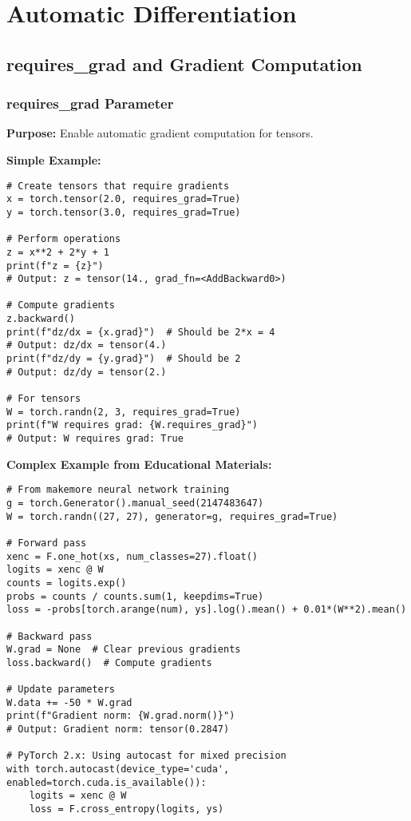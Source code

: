 \documentclass[11pt,a4paper]{book}
\begin{document}
\chapter{Automatic Differentiation}

\section{requires\_grad and Gradient Computation}

\subsection{requires\_grad Parameter}

\textbf{Purpose:} Enable automatic gradient computation for tensors.

\textbf{Simple Example:}
\begin{verbatim}
# Create tensors that require gradients
x = torch.tensor(2.0, requires_grad=True)
y = torch.tensor(3.0, requires_grad=True)

# Perform operations
z = x**2 + 2*y + 1
print(f"z = {z}")
# Output: z = tensor(14., grad_fn=<AddBackward0>)

# Compute gradients
z.backward()
print(f"dz/dx = {x.grad}")  # Should be 2*x = 4
# Output: dz/dx = tensor(4.)
print(f"dz/dy = {y.grad}")  # Should be 2
# Output: dz/dy = tensor(2.)

# For tensors
W = torch.randn(2, 3, requires_grad=True)
print(f"W requires grad: {W.requires_grad}")
# Output: W requires grad: True
\end{verbatim}

\textbf{Complex Example from Educational Materials:}
\begin{verbatim}
# From makemore neural network training
g = torch.Generator().manual_seed(2147483647)
W = torch.randn((27, 27), generator=g, requires_grad=True)

# Forward pass
xenc = F.one_hot(xs, num_classes=27).float()
logits = xenc @ W
counts = logits.exp()
probs = counts / counts.sum(1, keepdims=True)
loss = -probs[torch.arange(num), ys].log().mean() + 0.01*(W**2).mean()

# Backward pass
W.grad = None  # Clear previous gradients
loss.backward()  # Compute gradients

# Update parameters
W.data += -50 * W.grad
print(f"Gradient norm: {W.grad.norm()}")
# Output: Gradient norm: tensor(0.2847)

# PyTorch 2.x: Using autocast for mixed precision
with torch.autocast(device_type='cuda', enabled=torch.cuda.is_available()):
    logits = xenc @ W
    loss = F.cross_entropy(logits, ys)
\end{verbatim}
\end{document}
